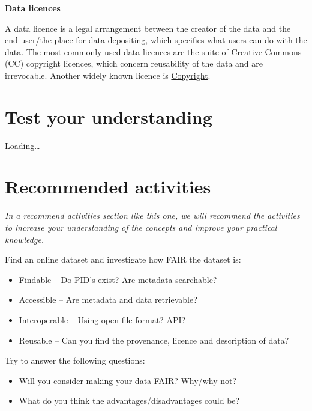\documentclass[
]{book}
\providecommand{\tightlist}{%
  \setlength{\itemsep}{0pt}\setlength{\parskip}{0pt}}
\begin{document}
\textbf{Data licences}

A data licence is a legal arrangement between the creator of the data and the end-user/the place for data depositing, which specifies what users can do with the data. The most commonly used data licences are the suite of \href{https://en.wikipedia.org/wiki/Creative_Commons}{Creative Commons} (CC) copyright licences, which concern reusability of the data and are irrevocable. Another widely known licence is \href{https://en.wikipedia.org/wiki/Copyright}{Copyright}.

\hypertarget{test-your-understanding}{%
\section{Test your understanding}\label{test-your-understanding}}

Loading\ldots{}

\hypertarget{recommended-activities}{%
\section{Recommended activities}\label{recommended-activities}}

\leavevmode{}%
\emph{In a recommend activities section like this one, we will recommend the activities to increase your understanding of the concepts and improve your practical knowledge.}

Find an online dataset and investigate how FAIR the dataset is:

\begin{itemize}
\tightlist
\item
  Findable -- Do PID's exist? Are metadata searchable?
\item
  Accessible -- Are metadata and data retrievable?
\item
  Interoperable -- Using open file format? API?
\item
  Reusable -- Can you find the provenance, licence and description of data?
\end{itemize}

Try to answer the following questions:

\begin{itemize}
\tightlist
\item
  Will you consider making your data FAIR? Why/why not?
\item
  What do you think the advantages/disadvantages could be?
\end{itemize}
\end{document}
